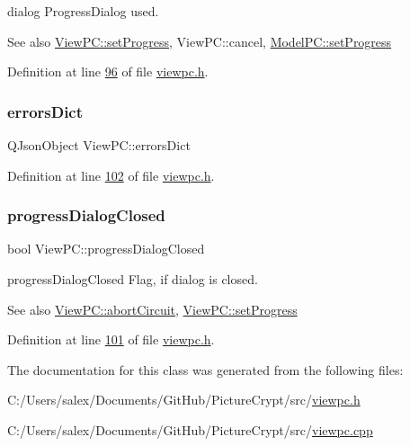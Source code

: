 dialog Progress\+Dialog used. 

\begin{DoxySeeAlso}{See also}
\mbox{\hyperlink{class_view_p_c_a9c32a1fdb6ead84e5ada8fba8860c7ed}{View\+P\+C\+::set\+Progress}}, View\+P\+C\+::cancel, \mbox{\hyperlink{class_model_p_c_a25a4496e129e87ac96f12257a123b84f}{Model\+P\+C\+::set\+Progress}} 
\end{DoxySeeAlso}


Definition at line \mbox{\hyperlink{viewpc_8h_source_l00096}{96}} of file \mbox{\hyperlink{viewpc_8h_source}{viewpc.\+h}}.

\mbox{\label{class_view_p_c_a26f90436aca32e5bad46f5e69a7e7e09}} 
\subsubsection{\texorpdfstring{errors\+Dict}{errorsDict}}
{\footnotesize\ttfamily Q\+Json\+Object View\+P\+C\+::errors\+Dict}



Definition at line \mbox{\hyperlink{viewpc_8h_source_l00102}{102}} of file \mbox{\hyperlink{viewpc_8h_source}{viewpc.\+h}}.

\mbox{\label{class_view_p_c_add8c82aa2b0b934212aa5bde9277ab36}} 
\subsubsection{\texorpdfstring{progress\+Dialog\+Closed}{progressDialogClosed}}
{\footnotesize\ttfamily bool View\+P\+C\+::progress\+Dialog\+Closed}



progress\+Dialog\+Closed Flag, if dialog is closed. 

\begin{DoxySeeAlso}{See also}
\mbox{\hyperlink{class_view_p_c_ad7ba2fcf1d17862de15e32432823f7b0}{View\+P\+C\+::abort\+Circuit}}, \mbox{\hyperlink{class_view_p_c_a9c32a1fdb6ead84e5ada8fba8860c7ed}{View\+P\+C\+::set\+Progress}} 
\end{DoxySeeAlso}


Definition at line \mbox{\hyperlink{viewpc_8h_source_l00101}{101}} of file \mbox{\hyperlink{viewpc_8h_source}{viewpc.\+h}}.



The documentation for this class was generated from the following files\+:\begin{DoxyCompactItemize}
\item 
C\+:/\+Users/salex/\+Documents/\+Git\+Hub/\+Picture\+Crypt/src/\mbox{\hyperlink{viewpc_8h}{viewpc.\+h}}\item 
C\+:/\+Users/salex/\+Documents/\+Git\+Hub/\+Picture\+Crypt/src/\mbox{\hyperlink{viewpc_8cpp}{viewpc.\+cpp}}\end{DoxyCompactItemize}
